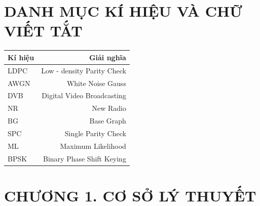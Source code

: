 \documentclass{article}
\renewcommand{\figurename}{\fontsize{12pt}{0pt}\selectfont \bfseries Hình} %
\renewcommand{\tablename}{\fontsize{12pt}{0pt}\selectfont \bfseries Bảng}
\begin{document}
\cleardoublepage
{}
\tableofcontents %
\thispagestyle{empty}
\cleardoublepage


\section*{DANH MỤC KÍ HIỆU VÀ CHỮ VIẾT TẮT}
 {}
\begin{table}[H]
    \centering
    \begin{tabularx}{0.8\textwidth}
    {
    |>{\centering\arraybackslash}M
    |>{\centering\arraybackslash}N|
    }
    \hline
      \bfseries Kí hiệu  &  \bfseries Giải nghĩa \\ \hline
        LDPC   & Low - density Parity Check   \\ \hline
        AWGN & White Noise Gauss \\ \hline
        DVB  & Digital Video Broadcasting   \\ \hline
        NR    &  New Radio\\ \hline
        BG   &  Base Graph \\ \hline
        SPC   &  Single Parity Check \\ \hline
        ML   &  Maximum Likelihood \\ \hline
        BPSK & Binary Phase Shift Keying  \\ \hline
    \end{tabularx}
\end{table}
\cleardoublepage

{\let\oldnumberline\numberline
\renewcommand{\numberline}{\figurename~\oldnumberline}
\listoffigures}%
 {}
\cleardoublepage
{\let\oldnumberline\numberline
\renewcommand{\numberline}{\tablename~\oldnumberline}
\listoftables} %
 {}
\cleardoublepage

\section*{CHƯƠNG 1. CƠ SỞ LÝ THUYẾT}
\setcounter{section}{1}
\setcounter{subsection}{0}
\setcounter{figure}{0}
\setcounter{table}{0}
\end{document}
